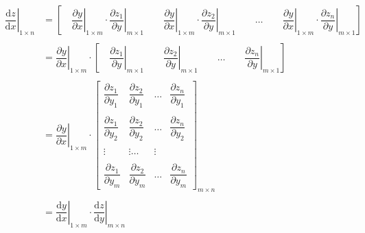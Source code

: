 \documentclass[withoutpreface,bwprint]{cumcmthesis} %
\begin{document}
	\begin{align*}
		\left.\dfrac{\mathrm{d} z}{\mathrm{d} x}\right|_{1{\times}n}&=
		\left[
		\quad
		\left.\dfrac{\partial y}{\partial  x}\right|_{1{\times}m} \cdot \left.\dfrac{\partial z_1}{\partial y}\right|_{m{\times}1}
		\quad\quad
		\left.\dfrac{\partial y}{\partial  x}\right|_{1{\times}m} \cdot \left.\dfrac{\partial z_2}{\partial y}\right|_{m{\times}1}
		\quad\quad
		\ldots
		\quad\quad
		\left.\dfrac{\partial y}{\partial  x}\right|_{1{\times}m} \cdot \left.\dfrac{\partial z_n}{\partial y}\right|_{m{\times}1}
		\right]\\\\
		&=\left.\dfrac{\partial y}{\partial  x}\right|_{1{\times}m} \cdot
		\left[
		\quad
		\left.\dfrac{\partial z_1}{\partial y}\right|_{m{\times}1}
		\quad\quad
		\left.\dfrac{\partial z_2}{\partial y}\right|_{m{\times}1}
		\quad\quad
		\ldots
		\quad\quad
		\left.\dfrac{\partial z_n}{\partial y}\right|_{m{\times}1}
		\right] \\\\
		&=\left.\dfrac{\partial y}{\partial  x}\right|_{1{\times}m} \cdot
		\left[
		\begin{array}{cccc}
			\dfrac{\partial z_1}{\partial y_1} & \dfrac{\partial z_2}{\partial y_1} & \ldots & \dfrac{\partial z_n}{\partial y_1}
			\\\\
			\dfrac{\partial z_1}{\partial y_2} & \dfrac{\partial z_2}{\partial y_2} & \ldots & \dfrac{\partial z_n}{\partial y_2}
			\\\\
			\vdots & \vdots \ldots & \vdots
			\\\\
			\dfrac{\partial z_1}{\partial y_m} & \dfrac{\partial z_2}{\partial y_m} & \ldots & \dfrac{\partial z_n}{\partial y_m}
		\end{array}
		\right]_{m{\times}n}
		\\\\
		&=\left.\dfrac{\mathrm{d} y}{\mathrm{d} x}\right|_{1{\times}m}\cdot  \left.\dfrac{\mathrm{d} z}{\mathrm{d} y}\right|_{m{\times}n}
	\end{align*}
	
\end{document}
